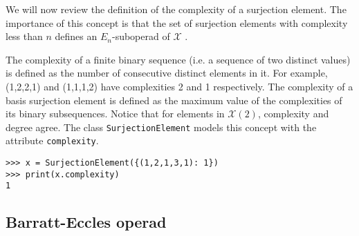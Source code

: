 \documentclass{amsart}
\begin{document}
We will now review the definition of the complexity of a surjection element. The importance of this concept is that the set of surjection elements with complexity less than $n$ defines an $E_n$-suboperad of $\mathcal X$ \cite{McClureSmith03}.

The complexity of a finite binary sequence (i.e. a sequence of two distinct values) is defined as the number of consecutive distinct elements in it. For example, (1,2,2,1) and (1,1,1,2) have complexities 2 and 1 respectively. The complexity of a basis surjection element is defined as the maximum value of the complexities of its binary subsequences. Notice that for elements in $\mathcal X(2)$, complexity and degree agree. The class \texttt{SurjectionElement} models this concept with the attribute \texttt{complexity}.

\begin{verbatim}
>>> x = SurjectionElement({(1,2,1,3,1): 1})
>>> print(x.complexity)
1
\end{verbatim}

\subsection{Barratt-Eccles operad}
\end{document}
